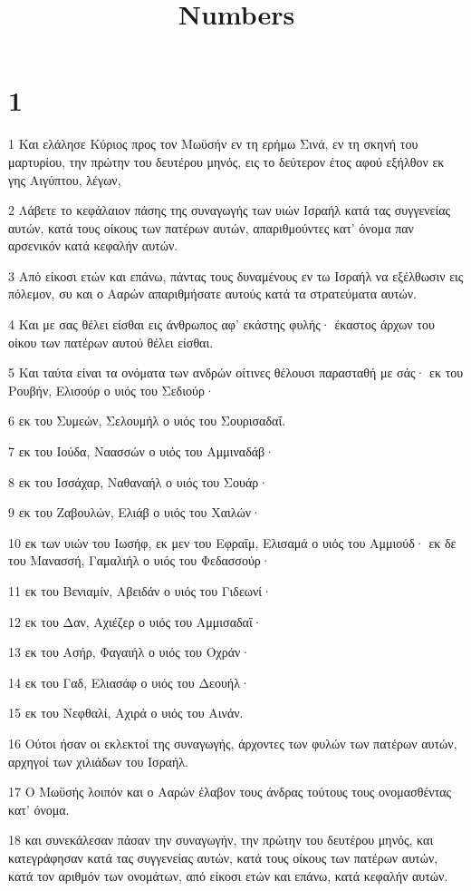 

\title{Numbers}


\chapter{1}

\par 1 Και ελάλησε Κύριος προς τον Μωϋσήν εν τη ερήμω Σινά, εν τη σκηνή του μαρτυρίου, την πρώτην του δευτέρου μηνός, εις το δεύτερον έτος αφού εξήλθον εκ γης Αιγύπτου, λέγων,
\par 2 Λάβετε το κεφάλαιον πάσης της συναγωγής των υιών Ισραήλ κατά τας συγγενείας αυτών, κατά τους οίκους των πατέρων αυτών, απαριθμούντες κατ' όνομα παν αρσενικόν κατά κεφαλήν αυτών.
\par 3 Από είκοσι ετών και επάνω, πάντας τους δυναμένους εν τω Ισραήλ να εξέλθωσιν εις πόλεμον, συ και ο Ααρών απαριθμήσατε αυτούς κατά τα στρατεύματα αυτών.
\par 4 Και με σας θέλει είσθαι εις άνθρωπος αφ' εκάστης φυλής· έκαστος άρχων του οίκου των πατέρων αυτού θέλει είσθαι.
\par 5 Και ταύτα είναι τα ονόματα των ανδρών οίτινες θέλουσι παρασταθή με σάς· εκ του Ρουβήν, Ελισούρ ο υιός του Σεδιούρ·
\par 6 εκ του Συμεών, Σελουμήλ ο υιός του Σουρισαδαΐ.
\par 7 εκ του Ιούδα, Ναασσών ο υιός του Αμμιναδάβ·
\par 8 εκ του Ισσάχαρ, Ναθαναήλ ο υιός του Σουάρ·
\par 9 εκ του Ζαβουλών, Ελιάβ ο υιός του Χαιλών·
\par 10 εκ των υιών του Ιωσήφ, εκ μεν του Εφραΐμ, Ελισαμά ο υιός του Αμμιούδ· εκ δε του Μανασσή, Γαμαλιήλ ο υιός του Φεδασσούρ·
\par 11 εκ του Βενιαμίν, Αβειδάν ο υιός του Γιδεωνί·
\par 12 εκ του Δαν, Αχιέζερ ο υιός του Αμμισαδαΐ·
\par 13 εκ του Ασήρ, Φαγαιήλ ο υιός του Οχράν·
\par 14 εκ του Γαδ, Ελιασάφ ο υιός του Δεουήλ·
\par 15 εκ του Νεφθαλί, Αχιρά ο υιός του Αινάν.
\par 16 Ούτοι ήσαν οι εκλεκτοί της συναγωγής, άρχοντες των φυλών των πατέρων αυτών, αρχηγοί των χιλιάδων του Ισραήλ.
\par 17 Ο Μωϋσής λοιπόν και ο Ααρών έλαβον τους άνδρας τούτους τους ονομασθέντας κατ' όνομα.
\par 18 και συνεκάλεσαν πάσαν την συναγωγήν, την πρώτην του δευτέρου μηνός, και κατεγράφησαν κατά τας συγγενείας αυτών, κατά τους οίκους των πατέρων αυτών, κατά τον αριθμόν των ονομάτων, από είκοσι ετών και επάνω, κατά κεφαλήν αυτών.
